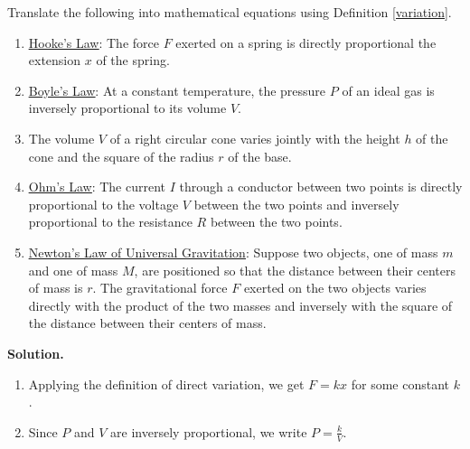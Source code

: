 \smallskip

\begin{ex}  Translate the following into mathematical equations using Definition \ref{variation}.

\begin{enumerate}

\item  \href{http://en.wikipedia.org/wiki/Hooke's_law}{\underline{Hooke's Law}}:   The force $F$ exerted on a spring is directly proportional the extension $x$ of the spring.

\item  \href{http://en.wikipedia.org/wiki/Boyle's_law}{\underline{Boyle's Law}}:   At a constant temperature, the pressure $P$ of an ideal gas is inversely proportional to its volume $V$.

\item  The volume $V$ of a right circular cone varies jointly with the height $h$ of the cone and the square of the radius $r$ of the base.

\item  \href{http://en.wikipedia.org/wiki/Ohm's_law}{\underline{Ohm's Law}}:   The current $I$ through a conductor between two points is directly proportional to the voltage $V$ between the two points and inversely proportional to the resistance $R$ between the two points.

\item \label{gravitylaw} \href{http://en.wikipedia.org/wiki/Law_of_universal_gravitation}{\underline{Newton's Law of Universal Gravitation}}:   Suppose two objects, one of mass $m$ and one of mass $M$, are positioned so that the distance between their centers of mass is $r$.  The gravitational force $F$ exerted on the two objects varies directly with the product of the two masses and inversely with the square of the distance between their centers of mass.

\end{enumerate}

{\bf Solution.}  

\begin{enumerate}

\item Applying the definition of direct variation, we get  $F = k x$ for some constant $k$.

\item Since $P$ and $V$ are inversely proportional, we write $P = \frac{k}{V}$.


\end{enumerate}
\end{ex}

